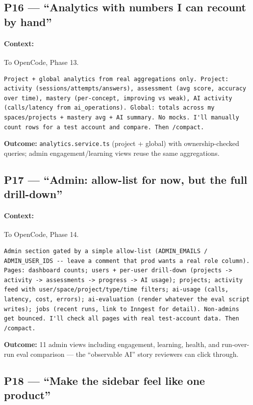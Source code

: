 \documentclass[11pt,a4paper]{article}
\begin{document}
\subsection{P16 --- ``Analytics with numbers I can recount by hand''}
\paragraph{Context:} To OpenCode, Phase 13.
\begin{lstlisting}
Project + global analytics from real aggregations only. Project: activity (sessions/attempts/answers), assessment (avg score, accuracy over time), mastery (per-concept, improving vs weak), AI activity (calls/latency from ai_operations). Global: totals across my spaces/projects + mastery avg + AI summary. No mocks. I'll manually count rows for a test account and compare. Then /compact.
\end{lstlisting}
\textbf{Outcome:} \texttt{analytics.service.ts} (project + global) with ownership-checked queries; admin engagement/learning views reuse the same aggregations.

\subsection{P17 --- ``Admin: allow-list for now, but the full drill-down''}
\paragraph{Context:} To OpenCode, Phase 14.
\begin{lstlisting}
Admin section gated by a simple allow-list (ADMIN_EMAILS / ADMIN_USER_IDS -- leave a comment that prod wants a real role column). Pages: dashboard counts; users + per-user drill-down (projects -> activity -> assessments -> progress -> AI usage); projects; activity feed with user/space/project/type/time filters; ai-usage (calls, latency, cost, errors); ai-evaluation (render whatever the eval script writes); jobs (recent runs, link to Inngest for detail). Non-admins get bounced. I'll check all pages with real test-account data. Then /compact.
\end{lstlisting}
\textbf{Outcome:} 11 admin views including engagement, learning, health, and run-over-run eval comparison --- the ``observable AI'' story reviewers can click through.

\subsection{P18 --- ``Make the sidebar feel like one product''}
\end{document}
